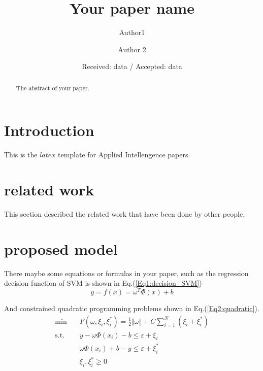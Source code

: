\documentclass[twocolumn]{svjour3}          %
\begin{document}
\title{Your paper name}

\author{Author1 \and Author 2}

\date{Received: data / Accepted: data}

\maketitle

\begin{abstract}
The abstract of your paper.
\end{abstract}
\section{Introduction}
This is the $latex$ \cite{lamport1994latex} template for Applied Intellengence papers.

\section{related work}
This section described the related work that have been done by other people.\\

\section{proposed model}
There maybe some equations or formulas in your paper, such as the regression decision function of SVM is shown in Eq.(\ref{Eq1:decision_SVM})
\begin{equation}
    y=f(x)=\omega^T\Phi(x)+b
    \label{Eq1:decision_SVM}
\end{equation}

And constrained quadratic programming problems shown in Eq.(\ref{Eq2:quadratic}).
\begin{equation}
  \begin{split} 
   \min\quad &  F(\omega,\xi_i,\xi_i^*)=\frac{1}{2}\Vert\omega  \Vert+C \sum_{i=1}^N (\xi_i+\xi_i^*)\\
   \mbox{s.t.}\quad
   &y-\omega\Phi(x_i)-b\leq \varepsilon+\xi_i\\
   &\omega\Phi(x_i)+b-y\leq \varepsilon+\xi_i^*\\
   &\xi_i,\xi_i^*\geq 0
  \end{split}
\label{Eq2:quadratic}
\end{equation}
\end{document}
